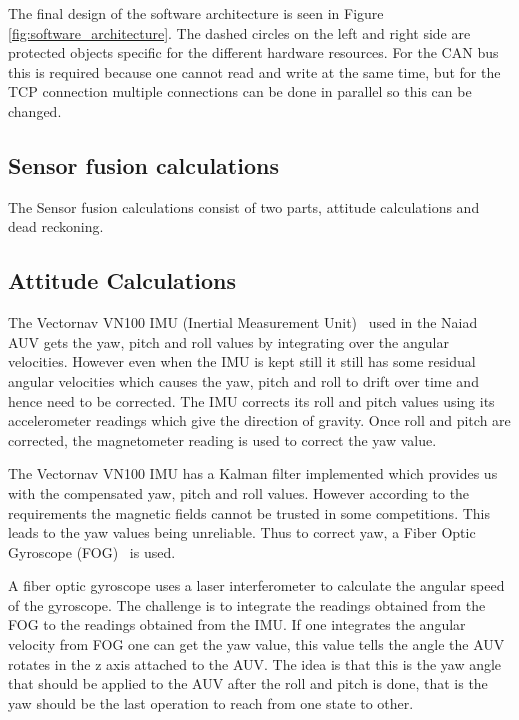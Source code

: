 The final design of the software architecture is seen in Figure \ref{fig:software_architecture}.
The dashed circles on the left and right side are protected objects specific for
the different hardware resources. For the CAN bus this is required because one
cannot read and write at the same time, but for the TCP connection multiple connections
can be done in parallel so this can be changed.


\subsection{Sensor fusion calculations}
The Sensor fusion calculations consist of two parts, attitude calculations and
dead reckoning.

\subsection{Attitude Calculations}
The Vectornav VN100 IMU (Inertial Measurement Unit)~\cite{web:vn100} used in 
the Naiad AUV gets the yaw, pitch and roll values by integrating over the
angular velocities. However even when the IMU is kept still it still has
some residual angular velocities which causes the yaw, pitch and roll to drift
over time and hence need to be corrected.
The IMU corrects its roll and pitch values using its accelerometer 
readings which give the direction of gravity.
Once roll and pitch are corrected, the magnetometer reading is used to correct
the yaw value.

The Vectornav VN100 IMU has a Kalman
filter implemented which provides us with the compensated yaw, pitch and roll
values. However according to the requirements the magnetic fields cannot be
trusted in some competitions. This leads to the yaw values being unreliable.
Thus to correct yaw, a Fiber Optic Gyroscope (FOG)~\cite{web:fog1} is used.

A fiber optic gyroscope uses a laser interferometer to calculate the angular
speed of the gyroscope. The challenge is to
integrate the readings obtained from the FOG to the readings obtained from
the IMU. If one integrates the angular velocity from FOG one can get the yaw value, 
this value tells the angle the AUV rotates in the z axis attached to the AUV.
The idea is that this is the yaw angle that should be applied to the AUV after
the roll and pitch is done, that is the yaw should be the last operation to
reach from one state to other.

